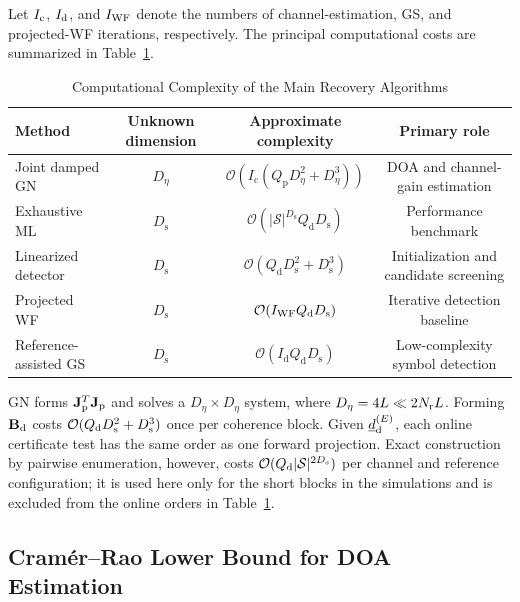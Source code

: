 \documentclass[journal]{IEEEtran}
\begin{document}
Let $I_{\rm c}$, $I_{\rm d}$, and $I_{\rm WF}$ denote the numbers of
channel-estimation, GS, and projected-WF iterations, respectively. The principal
computational costs are summarized in Table~\ref{tab:algorithm_complexity}.

\begin{table}[t]
\centering
\caption{Computational Complexity of the Main Recovery Algorithms}
\label{tab:algorithm_complexity}
\begin{tabular}{lccc}
\hline
Method & Unknown dimension & Approximate complexity & Primary role \\
\hline
Joint damped GN & $D_{\eta}$ &
$\mathcal{O}\!\left(
I_{\mathrm{c}}
\left(
Q_{\mathrm{p}}D_{\eta}^{2}
+
D_{\eta}^{3}
\right)
\right)$ & DOA and channel-gain estimation \\
Exhaustive ML & $D_{\mathrm{s}}$ &
$\mathcal{O}\!\left(
|\mathcal{S}|^{D_{\mathrm{s}}}
Q_{\mathrm{d}}D_{\mathrm{s}}
\right)$ & Performance benchmark \\
Linearized detector & $D_{\mathrm{s}}$ &
$\mathcal{O}\!\left(
Q_{\mathrm{d}}D_{\mathrm{s}}^{2}
+
D_{\mathrm{s}}^{3}
\right)$ & Initialization and candidate screening \\
Projected WF & $D_{\mathrm{s}}$ &
$\mathcal{O}\!\left(
I_{\rm WF}Q_{\mathrm{d}}D_{\mathrm{s}}
\right)$ & Iterative detection baseline \\
Reference-assisted GS & $D_{\mathrm{s}}$ &
$\mathcal{O}\!\left(
I_{\mathrm{d}}Q_{\mathrm{d}}D_{\mathrm{s}}
\right)$ & Low-complexity symbol detection \\
\hline
\end{tabular}
\end{table}

GN forms $\mathbf J_{\rm p}^{T}\mathbf J_{\rm p}$ and solves a
$D_\eta\times D_\eta$ system, where $D_\eta=4L\ll2N_{\rm r}L$.  Forming
$\mathbf B_{\rm d}$ costs
$\mathcal O(Q_{\rm d}D_{\rm s}^2+D_{\rm s}^3)$ once per coherence block.
Given $\underline d_{\rm d}^{(E)}$, each online certificate test has the same
order as one forward projection. Exact construction by pairwise enumeration,
however, costs $\mathcal O(Q_{\rm d}|\mathcal S|^{2D_{\rm s}})$ per channel and
reference configuration; it is used here only for the short blocks in the
simulations and is excluded from the online orders in
Table~\ref{tab:algorithm_complexity}.

\subsection{Cramér--Rao Lower Bound for DOA Estimation}
\label{subsec:crlb_doa}
\end{document}
